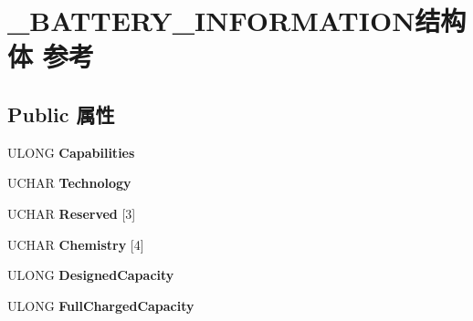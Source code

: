 \hypertarget{struct___b_a_t_t_e_r_y___i_n_f_o_r_m_a_t_i_o_n}{}\section{\+\_\+\+B\+A\+T\+T\+E\+R\+Y\+\_\+\+I\+N\+F\+O\+R\+M\+A\+T\+I\+O\+N结构体 参考}
\label{struct___b_a_t_t_e_r_y___i_n_f_o_r_m_a_t_i_o_n}
\subsection*{Public 属性}
\begin{DoxyCompactItemize}
\item 
\mbox{\label{struct___b_a_t_t_e_r_y___i_n_f_o_r_m_a_t_i_o_n_a8dcf5f70b0a59f98c327fcf3ad7ff9ad}} 
U\+L\+O\+NG {\bfseries Capabilities}
\item 
\mbox{\label{struct___b_a_t_t_e_r_y___i_n_f_o_r_m_a_t_i_o_n_ab24d7f48865d048d4f3338f99b41b54b}} 
U\+C\+H\+AR {\bfseries Technology}
\item 
\mbox{\label{struct___b_a_t_t_e_r_y___i_n_f_o_r_m_a_t_i_o_n_af2e431bbe43ce100ae0c33511916387c}} 
U\+C\+H\+AR {\bfseries Reserved} \mbox{[}3\mbox{]}
\item 
\mbox{\label{struct___b_a_t_t_e_r_y___i_n_f_o_r_m_a_t_i_o_n_a0d8f019007b6066bcc2d08f2216bd21b}} 
U\+C\+H\+AR {\bfseries Chemistry} \mbox{[}4\mbox{]}
\item 
\mbox{\label{struct___b_a_t_t_e_r_y___i_n_f_o_r_m_a_t_i_o_n_a268b90cc45f3ee1e6320e73cda175f35}} 
U\+L\+O\+NG {\bfseries Designed\+Capacity}
\item 
\mbox{\label{struct___b_a_t_t_e_r_y___i_n_f_o_r_m_a_t_i_o_n_a37dd635804eaefcd1e63fe599e0ff9e9}} 
U\+L\+O\+NG {\bfseries Full\+Charged\+Capacity}
\item 
\mbox{\label{struct___b_a_t_t_e_r_y___i_n_f_o_r_m_a_t_i_o_n_ab78fc027c6aecbe020def8f40ce3ce1d}} 

\end{DoxyCompactItemize}
